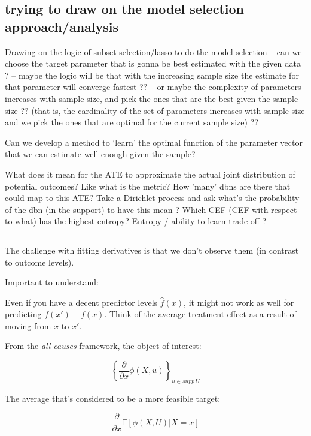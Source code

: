\documentclass[a4paper,12pt,twoside]{article}
\begin{document}
\subsection*{trying to draw on the model selection approach/analysis}

Drawing on the logic of subset selection/lasso to do the model selection -- can we choose the target parameter that is gonna be best estimated with the given data ? -- maybe the logic will be that with the increasing sample size the estimate for that parameter will converge fastest ?? -- or maybe the complexity of parameters increases with sample size, and pick the ones that are the best given the sample size ?? (that is, the cardinality of the set of parameters increases with sample size and we pick the ones that are optimal for the current sample size) ??

Can we develop a method to `learn' the optimal function of the parameter vector that we can estimate well enough given the sample?

What does it mean for the ATE to approximate the actual joint distribution of potential outcomes? Like what is the metric?
How 'many' dbns are there that could map to this ATE? Take a Dirichlet process and ask what's the probability of the dbn (in the support) to have this mean ?
Which CEF (CEF with respect to what) has the highest entropy?
Entropy / ability-to-learn trade-off ?


\noindent\rule{\textwidth}{0.5pt}


The challenge with fitting derivatives is that we don't observe them (in contrast to outcome levels).

Important to understand:

Even if you have a decent predictor levels $\hat f(x)$, it might not work as well for predicting $f(x') - f(x)$. Think of the average treatment effect as a result of moving from $x$ to $x'$.

From the \textit{all causes} framework, the object of interest:

\begin{equation}
	\left\{ \frac{\partial}{\partial x} \phi(X, u) \right\}_{u \in supp \, U}
\end{equation}


The average that's considered to be a more feasible target:

\begin{equation}
	\frac{\partial}{\partial x} \mathbb{E} \left[ \phi(X, U) | X = x \right]
\end{equation}
\end{document}
